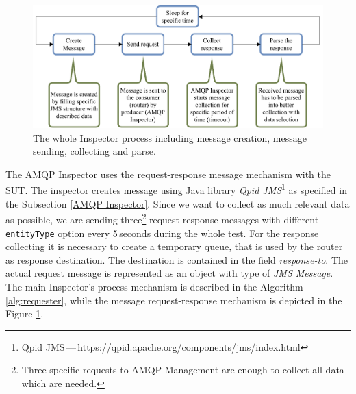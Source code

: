 \begin{figure}[H]
  \centering
  \includegraphics[width=12.5cm]{obrazky-figures/inspector_collector.pdf}
  \caption{The whole Inspector process including message creation, message sending, collecting and parse.}
  \label{fig:collector}
\end{figure}


The AMQP Inspector uses the request-response message mechanism with the SUT. The inspector creates message using Java library \emph{Qpid JMS}\footnote{Qpid JMS\,---\,\url{https://qpid.apache.org/components/jms/index.html}} as specified in the Subsection \ref{AMQP Inspector}. Since we want to collect as much relevant data as possible, we are sending three\footnote{Three specific requests to AMQP Management are enough to collect all data which are needed.} request-response messages with different \texttt{entityType} option every 5\,seconds during the whole test. For the response collecting it is necessary to create a temporary queue, that is used by the router as response destination. The destination is contained in the field \emph{response-to}. The actual request message is represented as an object with type of \emph{JMS Message}. The main Inspector's process mechanism is described in the Algorithm \ref{alg:requester}, while the message request-response mechanism is depicted in the Figure \ref{fig:collector}.
